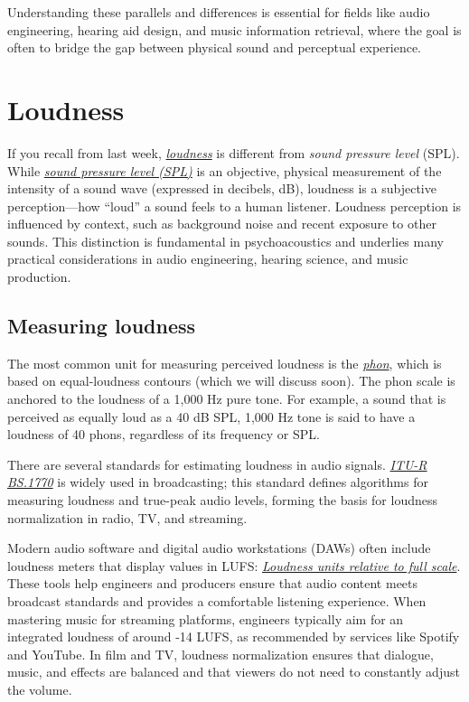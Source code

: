 \documentclass{article}
\begin{document}
Understanding these parallels and differences is essential for fields like audio engineering, hearing aid design, and music information retrieval, where the goal is often to bridge the gap between physical sound and perceptual experience.

\section{Loudness}

If you recall from last week, \textit{\href{https://en.wikipedia.org/wiki/Loudness}{loudness}} is different from \textit{sound pressure level} (SPL). While \textit{\href{https://en.wikipedia.org/wiki/Sound\_pressure\#Sound\_pressure\_level}{sound pressure level (SPL)}} is an objective, physical measurement of the intensity of a sound wave (expressed in decibels, dB), loudness is a subjective perception---how ``loud'' a sound feels to a human listener. Loudness perception is influenced by context, such as background noise and recent exposure to other sounds. This distinction is fundamental in psychoacoustics and underlies many practical considerations in audio engineering, hearing science, and music production.

\subsection{Measuring loudness}

The most common unit for measuring perceived loudness is the \textit{\href{https://en.wikipedia.org/wiki/Phon}{phon}}, which is based on equal-loudness contours (which we will discuss soon). The phon scale is anchored to the loudness of a 1,000 Hz pure tone. For example, a sound that is perceived as equally loud as a 40 dB SPL, 1,000 Hz tone is said to have a loudness of 40 phons, regardless of its frequency or SPL.

There are several standards for estimating loudness in audio signals. \textit{\href{https://en.wikipedia.org/wiki/ITU-R\_BS.1770}{ITU-R BS.1770}} is widely used in broadcasting; this standard defines algorithms for measuring loudness and true-peak audio levels, forming the basis for loudness normalization in radio, TV, and streaming.

Modern audio software and digital audio workstations (DAWs) often include loudness meters that display values in LUFS: \textit{\href{https://en.wikipedia.org/wiki/LUFS}{Loudness units relative to full scale}}. These tools help engineers and producers ensure that audio content meets broadcast standards and provides a comfortable listening experience. When mastering music for streaming platforms, engineers typically aim for an integrated loudness of around -14 LUFS, as recommended by services like Spotify and YouTube. In film and TV, loudness normalization ensures that dialogue, music, and effects are balanced and that viewers do not need to constantly adjust the volume.
\end{document}
